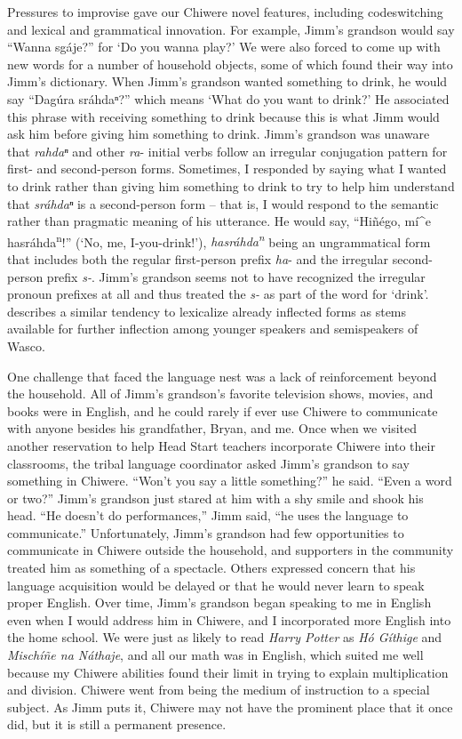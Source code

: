 \documentclass[output=paper]{LSP/langsci}
\begin{document}
Pressures to improvise gave our Chiwere novel features, including codeswitching and lexical and grammatical innovation. For example, Jimm's grandson would say ``Wanna sg\'aje?'' for `Do you wanna play?' We were also forced to come up with new words for a number of household objects, some of which found their way into Jimm's dictionary. When Jimm's grandson wanted something to drink, he would say ``Dag\'ura sr\'ahdaⁿ?'' which means `What do you want to drink?' He associated this phrase with receiving something to drink because this is what Jimm would ask him before giving him something to drink. Jimm's grandson was unaware that \emph{rahdaⁿ} and other \emph{ra}- initial verbs follow an irregular conjugation pattern for first- and second-person forms. Sometimes, I responded by saying what I wanted to drink rather than giving him something to drink to try to help him understand that \emph{sr\'ahdaⁿ} is a second-person form -- that is, I would respond to the semantic rather than pragmatic meaning of his utterance. He would say, ``Hi\~n\'ego, m\'i\^{ }e hasr\'ahda\textsuperscript{n}!'' (`No, me, I-you-drink!'), \emph{hasr\'ahda\textsuperscript{n}} being an ungrammatical form that includes both the regular first-person prefix \emph{ha}- and the irregular second-person prefix \emph{s-}. Jimm's grandson seems not to have recognized the irregular pronoun prefixes at all and thus treated the \emph{s-} as part of the word for `drink'.  describes a similar tendency to lexicalize already inflected forms as stems available for further inflection among younger speakers and semispeakers of Wasco. 

One challenge that faced the language nest was a lack of reinforcement beyond the household. All of Jimm's grandson's favorite television shows, movies, and books were in English, and he could rarely if ever use Chiwere to communicate with anyone besides his grandfather, Bryan, and me. Once when we visited another reservation to help Head Start teachers incorporate Chiwere into their classrooms, the tribal language coordinator asked Jimm's grandson to say something in Chiwere. ``Won't you say a little something?'' he said. ``Even a word or two?'' Jimm's grandson just stared at him with a shy smile and shook his head. ``He doesn't do performances,'' Jimm said, ``he uses the language to communicate.'' Unfortunately, Jimm's grandson had few opportunities to communicate in Chiwere outside the household, and supporters in the community treated him as something of a spectacle. Others expressed concern that his language acquisition would be delayed or that he would never learn to speak proper English. Over time, Jimm's grandson began speaking to me in English even when I would address him in Chiwere, and I incorporated more English into the home school. We were just as likely to read \emph{Harry Potter} as \emph{H\'o G\'ithige} and \emph{Misch\'i\~ne na N\'athaje}, and all our math was in English, which suited me well because my Chiwere abilities found their limit in trying to explain multiplication and division. Chiwere went from being the medium of instruction to a special subject. As Jimm puts it, Chiwere may not have the prominent place that it once did, but it is still a permanent presence.
\end{document}
